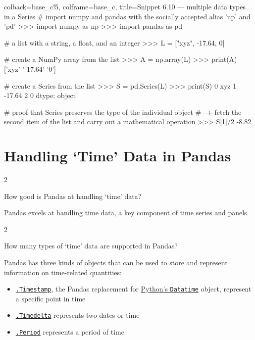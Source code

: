\documentclass[a4paper,11pt]{book}
\newcommand{\question}[1]{%
    \begin{tcolorbox}[colback=comp_c!10,colframe=comp_c,sidebyside align=top,width=\linewidth,before skip=1ex]
        #1
    \end{tcolorbox}
    \switchcolumn%
}
\newcommand{\note}[1]{%
    \begin{tcolorbox}[colback=white!0,colframe=white!10,width=\linewidth,before skip=1ex]
        #1
    \end{tcolorbox}
}
\begin{document}
\begin{pythoncode}[linenos=True]{colback=base_c!5, colframe=base_c, title=\sffamily Snippet 6.10 --- multiple data types in a Series}
# import numpy and pandas with the socially accepted alias 'np' and 'pd'
>>> import numpy as np
>>> import pandas as pd

# a list with a string, a float, and an integer
>>> L = ["xyz", -17.64, 0]

# create a NumPy array from the list
>>> A = np.array(L)
>>> print(A)
['xyz' '-17.64' '0']

# create a Series from the list
>>> S = pd.Series(L)
>>> print(S)
0      xyz
1   -17.64
2        0
dtype: object

# proof that Series preserves the type of the individual object
# --+ fetch the second item of the list and carry out a mathematical operation
>>> S[1]/2
-8.82
\end{pythoncode}


\section{Handling `Time' Data in Pandas}

\begin{paracol}{2}
	\question{\raggedright How good is Pandas at handling `time' data?}
	\note{Pandas excels at handling time data, a key component of time series and panels.
	}
\end{paracol}

\begin{paracol}{2}
	\question{\raggedright How many types of `time' data are supported in Pandas?}
	\note{Pandas has three kinds of objects that can be used to store and represent information on time-related quantities:

	\begin{itemize}
		\item \href{https://pandas.pydata.org/docs/reference/api/pandas.Timestamp.html}{\texttt{.Timestamp}}, the Pandas replacement for \href{https://docs.python.org/3/library/datetime.html}{Python's \texttt{Datatime}} object, represent a specific point in time 
		\item \href{https://pandas.pydata.org/docs/reference/api/pandas.Timedelta.html}{\texttt{.Timedelta}} represents two dates or time
		\item \href{https://pandas.pydata.org/docs/reference/api/pandas.Period.html}{\texttt{.Period}} represents a period of time
	\end{itemize}

	}
\end{paracol}
\clearpage
\end{document}
